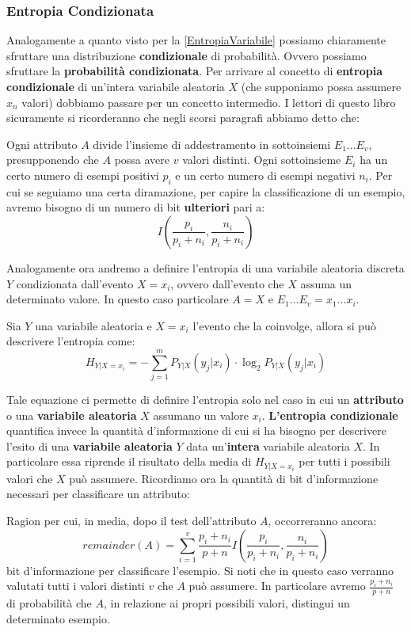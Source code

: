 \subsubsection{Entropia Condizionata}
Analogamente a quanto visto per la \ref{EntropiaVariabile} possiamo chiaramente sfruttare una distribuzione \textbf{condizionale} di probabilità. Ovvero possiamo sfruttare la \textbf{probabilità condizionata}. Per arrivare al concetto di \textbf{entropia condizionale} di un'intera variabile aleatoria $X$ (che supponiamo possa assumere $x_n$ valori) dobbiamo passare per un concetto intermedio. I lettori di questo libro sicuramente si ricorderanno che negli scorsi paragrafi abbiamo detto che:  
\begin{displayquote}
Ogni attributo $A$ divide l'insieme di addestramento in sottoinsiemi $E_1\dots E_v$, presupponendo che $A$ possa avere $v$ valori distinti. Ogni sottoinsieme $E_i$ ha un certo numero di esempi positivi $p_i$ e un certo numero di esempi negativi $n_i$. Per cui se seguiamo una certa diramazione, per capire la classificazione di un esempio, avremo bisogno di un numero di bit \textbf{ulteriori} pari a:
\[I\left(\frac{p_i}{p_i+n_i},\frac{n_i}{p_i+n_i}\right)\]
\end{displayquote}
Analogamente ora andremo a definire l'entropia di una variabile aleatoria discreta $Y$ condizionata dall'evento $X=x_i$, ovvero dall'evento che $X$ assuma un determinato valore. In questo caso particolare $A=X$ e $E_1 \dots E_v = x_1 \dots x_i$.
\begin{definizione}
Sia $Y$ una variabile aleatoria e $X=x_i$ l'evento che la coinvolge, allora si può descrivere l'entropia come:
  \begin{equation}
    H_{Y|X=x_i}=-\sum_{j=1}^m P_{Y|X}(y_j|x_i)\cdot\log_2 P_{Y|X}(y_j|x_i)
\label{EntropiaCondizionaleParziale}
\end{equation}
\end{definizione}
Tale equazione ci permette di definire l'entropia solo nel caso in cui un \textbf{attributo} o una \textbf{variabile aleatoria} $X$ assumano un valore $x_i$. 
\textbf{L'entropia condizionale} quantifica invece la quantità d'informazione di cui si ha bisogno per descrivere l'esito di una \textbf{variabile aleatoria} $Y$ data un'\textbf{intera} variabile aleatoria $X$. In particolare essa riprende il risultato della media di $H_{Y|X=x_i}$ per tutti i possibili valori che $X$ può assumere. 
Ricordiamo ora la quantità di bit d'informazione necessari per classificare un attributo:
\begin{displayquote}
Ragion per cui, in media, dopo il test dell'attributo $A$, occorreranno ancora:
\begin{equation}
\label{IG Attributo}
remainder(A)=\sum_{i=1}^v \frac{p_i+n_i}{p+n}
  I\left(\frac{p_i}{p_i+n_i},\frac{n_i}{p_i+n_i}\right)
    \end{equation}
bit d'informazione per classificare l'esempio. Si noti che in questo caso verranno valutati tutti i valori distinti $v$ che $A$ può assumere. In particolare avremo $\frac{p_i+n_i}{p+n}$ di probabilità che $A$, in relazione ai propri possibili valori, distingui un determinato esempio.
\end{displayquote}
